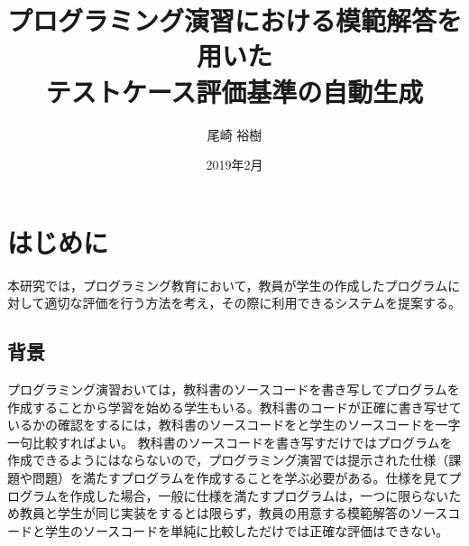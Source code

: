 \documentclass{tpu-sotu}
\author{尾崎 裕樹}
\title{プログラミング演習における模範解答を用いた\\テストケース評価基準の自動生成}
\date{2019年2月}
\begin{document}
%
\maketitle
\clearpage
{}
\tableofcontents
\clearpage
{}
%

%
\chapter{はじめに}
本研究では，プログラミング教育において，教員が学生の作成したプログラムに対して適切な評価を行う方法を考え，その際に利用できるシステムを提案する。
\section{背景}
プログラミング演習おいては，教科書のソースコードを書き写してプログラムを作成することから学習を始める学生もいる。教科書のコードが正確に書き写せているかの確認をするには，教科書のソースコードをと学生のソースコードを一字一句比較すればよい。
教科書のソースコードを書き写すだけではプログラムを作成できるようにはならないので，プログラミング演習では提示された仕様（課題や問題）を満たすプログラムを作成することを学ぶ必要がある。仕様を見てプログラムを作成した場合，一般に仕様を満たすプログラムは，一つに限らないため教員と学生が同じ実装をするとは限らず，教員の用意する模範解答のソースコードと学生のソースコードを単純に比較しただけでは正確な評価はできない。
\end{document}
